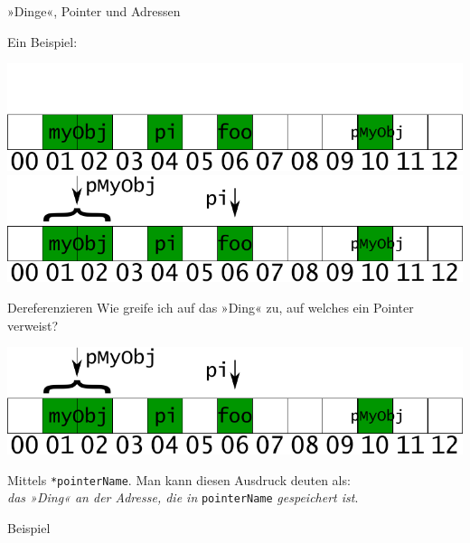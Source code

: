 \begin{frame}[fragile, t]{»Dinge«, Pointer und Adressen}
\begin{overprint}
	\footnotesize
	\begin{block}{Ein Beispiel:}
		\onslide*<1>
		{
			
		}
		{
			
		}
		{
			
		}
	\end{block}
	
	\vspace{1em}
	{
		\includegraphics[width=\linewidth]{images/object_points_addr_0}
	}
	\onslide*<5->
	{
		\includegraphics[width=\linewidth]{images/object_points_addr_1}
	}
\end{overprint}
\end{frame}


\begin{frame}[fragile]{Dereferenzieren}
	Wie greife ich auf das »Ding« zu, auf welches ein Pointer verweist?
	
	\vspace{0.5em}
	\includegraphics[width=0.75\linewidth]{images/object_points_addr_1}
	\vspace{0.5em}
	
	\pause
	\vspace{1em}
	
	Mittels \verb|*pointerName|. Man kann diesen Ausdruck deuten als:\\
	\emph{das »Ding« an der Adresse, die in} \verb|pointerName| \emph{gespeichert ist}.
	{\footnotesize
	\begin{block}{Beispiel}
		
	\end{block}
	}
\end{frame}


